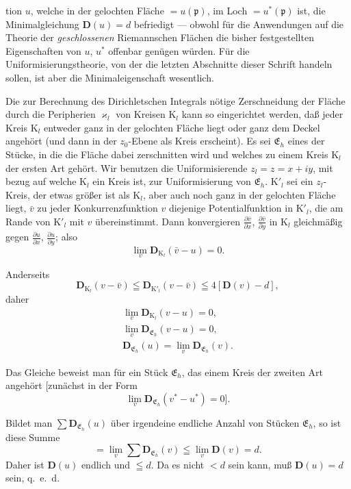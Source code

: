 \documentclass{article}
\begin{document}
tion $u$, welche in der gelochten Fläche $= u(\mathfrak{p})$, im Loch $= u^*(\mathfrak{p})$ ist, die Minimalgleichung $\mathbf{D}(u) = d$ befriedigt --- obwohl für die Anwendungen auf die Theorie der \emph{geschlossenen} Riemannschen Flächen die bisher festgestellten Eigenschaften von $u$, $u^*$ offenbar genügen würden. Für die Uniformisierungstheorie, von der die letzten Abschnitte dieser Schrift handeln sollen, ist aber die Minimaleigenschaft wesentlich.

Die zur Berechnung des Dirichletschen Integrals nötige Zerschneidung der Fläche durch die Peripherien $\varkappa_l$ von Kreisen $\mathrm{K}_l$ kann so eingerichtet werden, daß jeder Kreis $\mathrm{K}_l$ entweder ganz in der gelochten Fläche liegt oder ganz dem Deckel angehört (und dann in der $z_0$-Ebene als Kreis erscheint). Es sei $\mathfrak{E}_h$ eines der Stücke, in die die Fläche dabei zerschnitten wird und welches zu einem Kreis $\mathrm{K}_l$ der ersten Art gehört. Wir benutzen die Uniformisierende $z_l = z = x + iy$, mit bezug auf welche $\mathrm{K}_l$ ein Kreis ist, zur Uniformisierung von $\mathfrak{E}_h$. $\mathrm{K}'_l$ sei ein $z_l$-Kreis, der etwas größer ist als $\mathrm{K}_l$, aber auch noch ganz in der gelochten Fläche liegt, $\bar{v}$ zu jeder Konkurrenzfunktion $v$ diejenige Potentialfunktion in $\mathrm{K}'_l$, die am Rande von $\mathrm{K}'_l$ mit $v$ übereinstimmt. Dann konvergieren $\frac{\partial\bar{v}}{\partial x}$, $\frac{\partial\bar{v}}{\partial y}$ in $\mathrm{K}_l$ gleichmäßig gegen $\frac{\partial u}{\partial x}$, $\frac{\partial u}{\partial y}$; also
\[ \lim_v \mathbf{D}_{\mathrm{K}_l}(\bar{v} - u) = 0. \]

Anderseits
\[ \mathbf{D}_{\mathrm{K}_l}(v - \bar{v}) \leqq \mathbf{D}_{\mathrm{K}'_l}(v - \bar{v}) \leqq 4[\mathbf{D}(v) - d], \]
daher
\[ \begin{gathered}
\lim_v \mathbf{D}_{\mathrm{K}_l}(v - u) = 0, \\
\lim_v \mathbf{D}_{\mathfrak{E}_h}(v - u) = 0, \\
\mathbf{D}_{\mathfrak{E}_h}(u) = \lim_v \mathbf{D}_{\mathfrak{E}_h}(v).
\end{gathered} \]

Das Gleiche beweist man für ein Stück $\mathfrak{E}_h$, das einem Kreis der zweiten Art angehört [zunächst in der Form
\[ \lim_v \mathbf{D}_{\mathfrak{E}_h}(v^* - u^*) = 0]. \]

Bildet man $\displaystyle\sum\mathbf{D}_{\mathfrak{E}_h}(u)$ über irgendeine endliche Anzahl von Stücken $\mathfrak{E}_h$, so ist diese Summe
\[ = \lim_v \sum\mathbf{D}_{\mathfrak{E}_h}(v) \leqq \lim_v \mathbf{D}(v) = d. \]
Daher ist $\mathbf{D}(u)$ endlich und $\leqq d$. Da es nicht $< d$ sein kann, muß $\mathbf{D}(u) = d$ sein, q.~e.~d.
\end{document}
